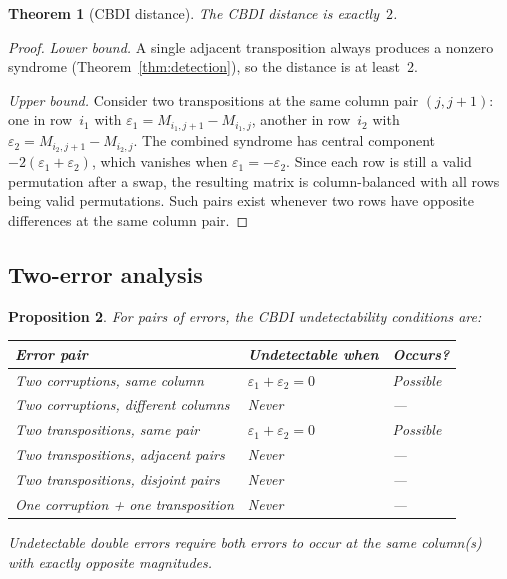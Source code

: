 \documentclass[11pt]{article}
\newtheorem{theorem}{Theorem}
\newtheorem{proposition}[theorem]{Proposition}
\begin{document}
\begin{theorem}[CBDI distance]\label{thm:distance}
The CBDI distance is exactly~$2$.
\end{theorem}

\begin{proof}
\emph{Lower bound.} A single adjacent transposition always produces a nonzero syndrome (Theorem~\ref{thm:detection}), so the distance is at least~2.

\emph{Upper bound.} Consider two transpositions at the same column pair $(j, j+1)$: one in row~$i_1$ with $\varepsilon_1 = M_{i_1,j+1} - M_{i_1,j}$, another in row~$i_2$ with $\varepsilon_2 = M_{i_2,j+1} - M_{i_2,j}$. The combined syndrome has central component $-2(\varepsilon_1 + \varepsilon_2)$, which vanishes when $\varepsilon_1 = -\varepsilon_2$. Since each row is still a valid permutation after a swap, the resulting matrix is column-balanced with all rows being valid permutations. Such pairs exist whenever two rows have opposite differences at the same column pair.
\end{proof}

\subsection{Two-error analysis}

\begin{proposition}\label{prop:two-errors}
For pairs of errors, the CBDI undetectability conditions are:
\begin{center}
\renewcommand{\arraystretch}{1.3}
\begin{tabular}{lll}
\toprule
Error pair & Undetectable when & Occurs? \\
\midrule
Two corruptions, same column & $\varepsilon_1 + \varepsilon_2 = 0$ & Possible \\
Two corruptions, different columns & Never & --- \\
Two transpositions, same pair & $\varepsilon_1 + \varepsilon_2 = 0$ & Possible \\
Two transpositions, adjacent pairs & Never & --- \\
Two transpositions, disjoint pairs & Never & --- \\
One corruption + one transposition & Never & --- \\
\bottomrule
\end{tabular}
\end{center}
Undetectable double errors require both errors to occur at the same column(s) with exactly opposite magnitudes.
\end{proposition}
\end{document}
